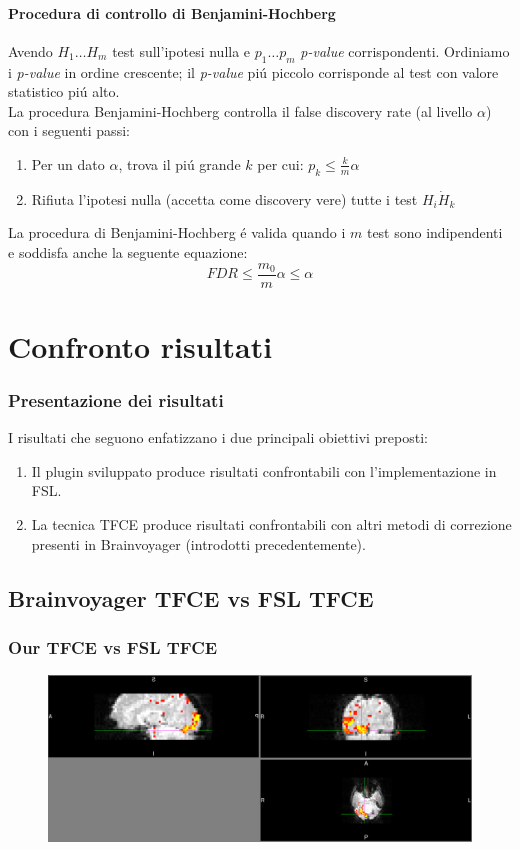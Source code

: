 \documentclass{beamer}
\begin{document}
\begin{frame}
\framesubtitle{Procedura di controllo di Benjamini-Hochberg}
Avendo $H_1 \dots H_m$ test sull'ipotesi nulla e $p_1 \dots p_m$ \textit{p-value} corrispondenti. Ordiniamo i \textit{p-value} in ordine crescente; il \textit{p-value} pi\'u piccolo corrisponde al test con valore statistico pi\'u alto.\\
\smallskip
La procedura Benjamini-Hochberg controlla il false discovery rate (al livello $\alpha$) con i seguenti passi:\\
\medskip
\begin{enumerate}
\item Per un dato $\alpha$, trova il pi\'u grande $k$ per cui: $p_k \leq \frac{k}{m}\alpha$
\item Rifiuta l'ipotesi nulla (accetta come discovery vere) tutte i test $H_i \dot H_k$
\end{enumerate}
La procedura di Benjamini-Hochberg \'e valida quando i $m$ test sono indipendenti e soddisfa anche la seguente equazione:
\begin{equation*}
FDR \leq \frac{m_0}{m}\alpha \leq \alpha
\end{equation*}
\end{frame}

\section{Confronto risultati}

\begin{frame}
\frametitle{Presentazione dei risultati}
I risultati che seguono enfatizzano i due principali obiettivi preposti:
\begin{enumerate}
\item Il plugin sviluppato produce risultati confrontabili con l'implementazione in FSL.
\item La tecnica TFCE produce risultati confrontabili con altri metodi di correzione presenti in Brainvoyager (introdotti precedentemente).
\end{enumerate}
\end{frame}

\subsection{Brainvoyager TFCE vs FSL TFCE}
\begin{frame}
\frametitle{Our TFCE vs FSL TFCE}
\begin{figure}
    \centering
        \includegraphics[width=\textwidth]{Images/FSLcorrected.png}
\end{figure}
\end{frame}
\end{document}
